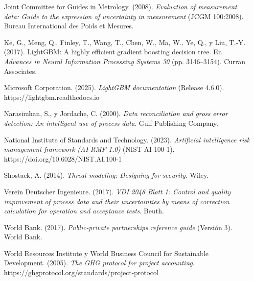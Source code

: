 \documentclass[formulario]{../../comun/overfore}
\begin{document}
\begin{referencias}
\item Joint Committee for Guides in Metrology. (2008). \emph{Evaluation of measurement data: Guide to the expression of uncertainty in measurement} (JCGM 100:2008). Bureau International des Poids et Mesures.
\item Ke, G., Meng, Q., Finley, T., Wang, T., Chen, W., Ma, W., Ye, Q., y Liu, T.-Y. (2017). LightGBM: A highly efficient gradient boosting decision tree. En \emph{Advances in Neural Information Processing Systems 30} (pp. 3146–3154). Curran Associates.
\item Microsoft Corporation. (2025). \emph{LightGBM documentation} (Release 4.6.0). https://lightgbm.readthedocs.io
\item Narasimhan, S., y Jordache, C. (2000). \emph{Data reconciliation and gross error detection: An intelligent use of process data}. Gulf Publishing Company.
\item National Institute of Standards and Technology. (2023). \emph{Artificial intelligence risk management framework (AI RMF 1.0)} (NIST AI 100-1). https://doi.org/10.6028/NIST.AI.100-1
\item Shostack, A. (2014). \emph{Threat modeling: Designing for security}. Wiley.
\item Verein Deutscher Ingenieure. (2017). \emph{VDI 2048 Blatt 1: Control and quality improvement of process data and their uncertainties by means of correction calculation for operation and acceptance tests}. Beuth.
\item World Bank. (2017). \emph{Public-private partnerships reference guide} (Versión 3). World Bank.
\item World Resources Institute y World Business Council for Sustainable Development. (2005). \emph{The GHG protocol for project accounting}. https://ghgprotocol.org/standards/project-protocol
\end{referencias}
\end{document}
